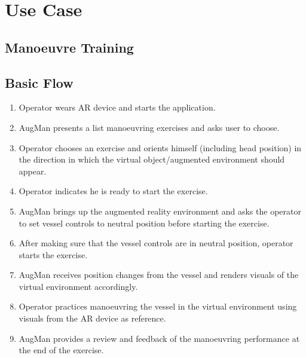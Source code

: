 \section{Use Case}
\label{sec:usecase}
\subsection{Manoeuvre Training}


\subsection{Basic Flow}
\begin{enumerate}[itemsep=.01em]
	\item Operator wears AR device and starts the application. 
	\item AugMan presents a list manoeuvring exercises and asks user to choose.
	\item Operator chooses an exercise and orients himself (including head position) in the direction in which the virtual object/augmented environment should appear.
	\item Operator indicates he is ready to start the exercise.
	\item AugMan brings up the augmented reality environment and asks the operator to set vessel controls to neutral position before starting the exercise.
	\item After making sure that the vessel controls are in neutral position, operator starts the exercise. 
	\item AugMan receives position changes from the vessel and renders visuals of the virtual environment accordingly.
	\item Operator practices manoeuvring the vessel in the virtual environment using visuals from the AR device as reference.
	\item AugMan provides a review and feedback of the manoeuvring performance at the end of the exercise.
\end{enumerate}

